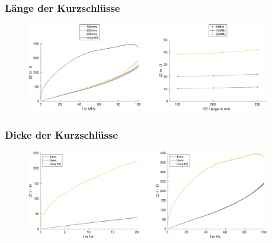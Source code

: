 \documentclass[accentcolor=tud9b, colorbacktitle, inverttitle]{tudbeamer}
\begin{document}

\begin{frame}\frametitle{Länge der Kurzschlüsse}
\vspace{-1em}
\begin{figure}[h]
	\centering
	\includegraphics[width=0.95\textwidth]{Z_ges_length_frequency_SimMeas}
\end{figure}
\end{frame}





\begin{frame}\frametitle{Dicke der Kurzschlüsse}
\vspace{-1em}
\begin{figure}[h]
	\centering
	\includegraphics[width=0.95\textwidth]{Z_RK_thick_1KS}
\end{figure}
\end{frame}
\end{document}
